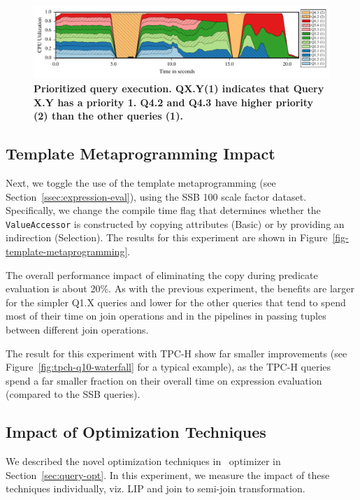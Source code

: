 \begin{figure}[htb]
   \vspace*{3em}
  \centering
   \includegraphics[width=\textwidth]{system/figures/2-high-priority-queries.pdf}
   \caption{\textbf{Prioritized query execution. QX.Y(1) indicates that Query X.Y has a priority 1. Q4.2 and Q4.3 have higher priority (2) than the other queries (1).}}
   \label{fig-high-priority}
\end{figure}

\subsection{Template Metaprogramming Impact}
\label{sec:expt:vectorization}

Next, we toggle the use of the template metaprogramming (see Section~\ref{ssec:expression-eval}), using the SSB 100 scale factor dataset. Specifically, we change the compile time flag that determines whether the \texttt{ValueAccessor} is constructed by copying attributes (Basic) or by providing an indirection (Selection). The results for this experiment are shown in Figure~\ref{fig-template-metaprogramming}.

The overall performance impact of eliminating the copy during predicate evaluation is about 20\%. As with the previous experiment, the benefits are larger for the simpler Q1.X queries and lower for the other queries that tend to spend most of their time on join operations and in the pipelines in passing tuples between different join operations.

The result for this experiment with TPC-H show far smaller improvements (see Figure~\ref{fig:tpch-q10-waterfall} for a typical example), as the TPC-H queries spend a far smaller fraction on their overall time on expression evaluation (compared to the SSB queries).

\subsection{Impact of Optimization Techniques}
\label{sec:expt:optimization}
We described the novel optimization techniques in \Quickstep\ optimizer in Section~\ref{sec:query-opt}. In this experiment,
we measure the impact of these techniques individually, viz. LIP and join to semi-join transformation.

